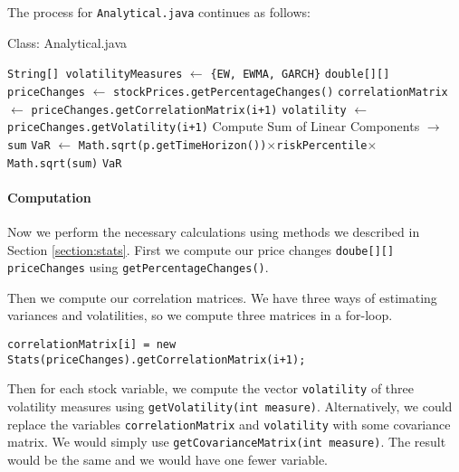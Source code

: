 \documentclass[../Dissertation.tex]{subfiles}
\begin{document}
The process for \lstinline|Analytical.java| continues as follows:
					\begin{algorithm}[H]
						\caption{Class: Analytical.java}
						\begin{algorithmic}[1]
							\label{class:Analytical}		
							\State \lstinline|String[] volatilityMeasures| $\gets$ \lstinline|{EW, EWMA, GARCH}|
							\State \lstinline|double[][] priceChanges| $\gets$ \lstinline|stockPrices.getPercentageChanges()|
									\State \lstinline|correlationMatrix| $\gets$ \lstinline|priceChanges.getCorrelationMatrix(i+1)|
									\State \lstinline|volatility| $\gets$ \lstinline|priceChanges.getVolatility(i+1)|
									\State Compute Sum of Linear Components $\to$ \lstinline|sum|
									\State \lstinline|VaR| $\gets$ \lstinline|Math.sqrt(p.getTimeHorizon())|$\times$\lstinline|riskPercentile|$\times$\lstinline|Math.sqrt(sum)|
								\EndFor
							\State \Return \lstinline|VaR|
						\EndFunction
						\end{algorithmic}
					\end{algorithm}

\iffalse
\paragraph{Computation}

Now we perform the necessary calculations using methods we described in Section \ref{section:stats}.
First we compute our price changes \lstinline|doube[][] priceChanges| using \lstinline|getPercentageChanges()|.

Then we compute our correlation matrices.
We have three ways of estimating variances and volatilities, so we compute three matrices in a for-loop.
\begin{lstlisting}[firstnumber = 33]
correlationMatrix[i] = new Stats(priceChanges).getCorrelationMatrix(i+1);
\end{lstlisting}

Then for each stock variable, we compute the vector \lstinline|volatility| of three volatility measures using \lstinline|getVolatility(int measure)|.
Alternatively, we could replace the variables \lstinline|correlationMatrix| and \lstinline|volatility| with some covariance matrix.
We would simply use \lstinline|getCovarianceMatrix(int measure)|. 
The result would be the same and we would have one fewer variable.
\end{document}
